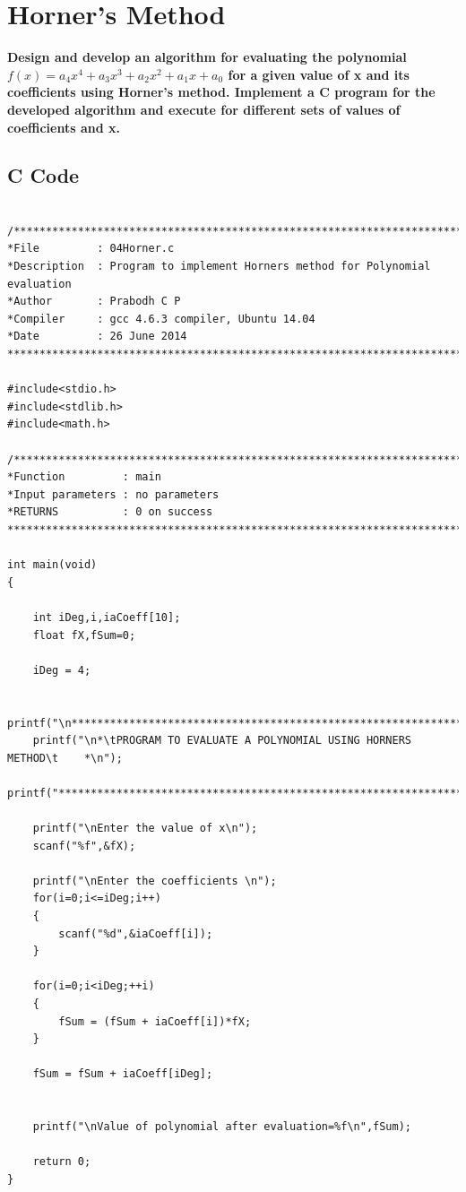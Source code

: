 \documentclass[a4paper]{report}
\begin{document}
\chapter{Horner's Method}
{\selectfont \textbf{Design and develop an algorithm for evaluating the polynomial \(f(x) = a_{4}x^{4} + a_{3}x^{3} + a_{2}x^{2} + a_{1}x + a_{0}\) for a given value of x and its coefficients using Horner’s method. Implement a C program for the developed algorithm and execute for different sets of values of coefficients and x.
}}

\section*{C Code}

\begin{Verbatim}

/***************************************************************************
*File         : 04Horner.c
*Description  : Program to implement Horners method for Polynomial evaluation
*Author       : Prabodh C P
*Compiler     : gcc 4.6.3 compiler, Ubuntu 14.04
*Date         : 26 June 2014
***************************************************************************/

#include<stdio.h>
#include<stdlib.h>
#include<math.h>

/***************************************************************************
*Function         :	main
*Input parameters :	no parameters
*RETURNS          :	0 on success
***************************************************************************/

int main(void)
{

	int iDeg,i,iaCoeff[10];
	float fX,fSum=0;
	
	iDeg = 4;

	printf("\n*********************************************************************");
	printf("\n*\tPROGRAM TO EVALUATE A POLYNOMIAL USING HORNERS METHOD\t    *\n");
	printf("*********************************************************************");

	printf("\nEnter the value of x\n");
	scanf("%f",&fX);

	printf("\nEnter the coefficients \n");
	for(i=0;i<=iDeg;i++)
	{
		scanf("%d",&iaCoeff[i]);
	}

	for(i=0;i<iDeg;++i)
	{
		fSum = (fSum + iaCoeff[i])*fX;
	}

	fSum = fSum + iaCoeff[iDeg];


	printf("\nValue of polynomial after evaluation=%f\n",fSum);

	return 0;
}

\end{Verbatim}
\end{document}
